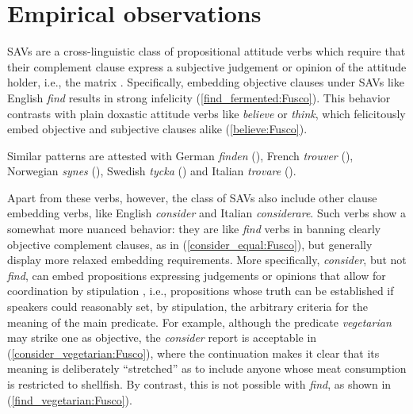 \documentclass[output=paper,colorlinks,citecolor=brown]{langscibook}
\begin{document}
\section{Empirical observations}
\label{sec:observations:Fusco}

SAVs are a cross-linguistic class of propositional attitude verbs which require that their complement clause express a subjective judgement or opinion of the attitude holder, i.e., the matrix . Specifically, embedding objective clauses under SAVs like English \textit{find} results in strong infelicity (\ref{find_fermented:Fusco}). This behavior contrasts with plain doxastic attitude verbs like \textit{believe} or \textit{think}, which felicitously embed objective and subjective clauses alike (\ref{believe:Fusco}).

\ea 
{} 
 \label{find_fermented:Fusco}
\z
\ex \label{believe:Fusco}
\z
\z

Similar patterns are attested with German \textit{finden} (\cite{saebo_2009,umbach_2016}), French \textit{trouver} (\cite{bouchard_thesis_2012}), Norwegian \textit{synes} (\cite{saebo_2009}), Swedish \textit{tycka} (\cite{saebo_2009,coppock_2018}) and Italian \textit{trovare} (\cite{fusco2022sav}). 

Apart from these verbs, however, the class of SAVs also include other clause embedding verbs, like English \textit{consider} and Italian \textit{considerare}. Such verbs show a somewhat more nuanced behavior: they are like \textit{find} verbs in banning clearly objective complement clauses, as in (\ref{consider_equal:Fusco}), 
but generally display more relaxed embedding requirements. More specifically, \emph{consider}, but not \emph{find}, can embed propositions expressing judgements or opinions that allow for coordination by stipulation \citep{kennedy_willer_2016,kennedy_willer_2022}, i.e., propositions whose truth can be established if speakers could reasonably set, by stipulation, the arbitrary criteria for the meaning of the main predicate.
For example, although the predicate \textit{vegetarian} may strike one as objective, the \textit{consider} report is acceptable in (\ref{consider_vegetarian:Fusco}), where the continuation makes it clear that its meaning is deliberately ``stretched'' as to include anyone whose meat consumption is restricted to shellfish. By contrast, this is not possible with \textit{find}, as shown in (\ref{find_vegetarian:Fusco}).
\end{document}
